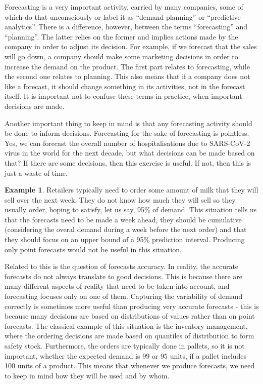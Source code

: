 \documentclass[
]{book}
\theoremstyle{definition}
\theoremstyle{definition}
\newtheorem{example}{Example}[chapter]
\theoremstyle{definition}
\theoremstyle{definition}
\theoremstyle{remark}
\begin{document}
Forecasting is a very important activity, carried by many companies, some of which do that unconsciously or label it as ``demand planning'' or ``predictive analytics''. There is a difference, however, between the terms ``forecasting'' and ``planning''. The latter relies on the former and implies actions made by the company in order to adjust its decision. For example, if we forecast that the sales will go down, a company should make some marketing decisions in order to increase the demand on the product. The first part relates to forecasting, while the second one relates to planning. This also means that if a company does not like a forecast, it should change something in its activities, not in the forecast itself. It is important not to confuse these terms in practice, when important decisions are made.

Another important thing to keep in mind is that any forecasting activity should be done to inform decisions. Forecasting for the sake of forecasting is pointless. Yes, we can forecast the overall number of hospitalisations due to SARS-CoV-2 virus in the world for the next decade, but what decisions can be made based on that? If there are some decisions, then this exercise is useful. If not, then this is just a waste of time.

\begin{example}
\protect\hypertarget{exm:unnamed-chunk-4}{}{\label{exm:unnamed-chunk-4} }Retailers typically need to order some amount of milk that they will sell over the next week. They do not know how much they will sell so they usually order, hoping to satisfy, let us say, 95\% of demand. This situation tells us that the forecasts need to be made a week ahead, they should be cumulative (considering the overal demand during a week before the next order) and that they should focus on an upper bound of a 95\% prediction interval. Producing only point forecasts would not be useful in this situation.
\end{example}

Related to this is the question of forecasts accuracy. In reality, the accurate forecasts do not always translate to good decisions. This is because there are many different aspects of reality that need to be taken into account, and forecasting focuses only on one of them. Capturing the variability of demand correctly is sometimes more useful than producing very accurate forecasts - this is because many decisions are based on distributions of values rather than on point forecasts. The classical example of this situation is the inventory management, where the ordering decisions are made based on quantiles of distribution to form safety stock. Furthermore, the orders are typically done in pallets, so it is not important, whether the expected demand is 99 or 95 units, if a pallet includes 100 units of a product. This means that whenever we produce forecasts, we need to keep in mind how they will be used and by whom.
\end{document}
